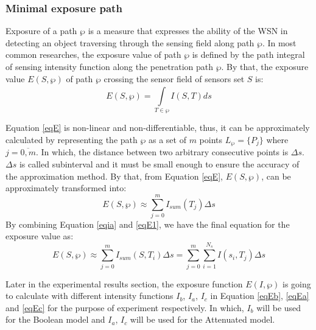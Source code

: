 \documentclass[final]{elsarticle}
\begin{document}
\subsubsection{Minimal exposure path}
Exposure of a path $ \wp $ is a measure that expresses the ability of the WSN in detecting an object traversing through the sensing field along path $ \wp $. In most common researches, the exposure value of path $ \wp $ is defined by the path integral of sensing intensity function along the penetration path $ \wp $. By that, the exposure value $  E(S,\wp ) $ of path $ \wp $ crossing the sensor field of sensors set $ S $ is:
\begin{equation}
\label{eqE}
E(S,\wp ) = \int\limits_{T \in \wp }^{} {I(S, T)} ds
\end{equation}

Equation \eqref{eqE} is non-linear and non-differentiable, thus,
it can be approximately calculated by representing the path $\wp $ as a set
of $ m $ points ${L_\wp } = \{ {P_j}\} $ where $j = \overline {0,m} $. In which, the distance between two arbitrary consecutive points is $\Delta s$. $\Delta s$ is called subinterval and it must be small enough to ensure the accuracy of the approximation method. By that, from Equation \eqref{eqE}, $ E(S,\wp ) $, can be approximately transformed into:
\begin{equation}
\label{eqE1}
E(S,\wp) \approx \sum\limits_{j = 0}^m {I_{sum}(T_j)\Delta s} 
\end{equation}
By combining Equation \eqref{eqia} and \eqref{eqE1}, we have the final equation for the exposure value as:
\begin{equation}
\label{eqEa}
E(S,\wp) \approx \sum\limits_{j = 0}^m {I_{sum}(S,T_i)\Delta s}  = \sum\limits_{j=0}^m {\sum\limits_{i=1}^{N_s} {I({s_i},{T_j})}} \Delta s
\end{equation}

Later in the experimental results section, the exposure function $ E(I,\wp )$ is going to calculate with different intensity functions $ I_b $,  $ I_a $, $ I_c$ in Equation \eqref{eqEb}, \eqref{eqEa} and \eqref{eqEc} for the purpose of experiment respectively. In which, $ I_b $ will be used for the Boolean model and $ I_a $, $ I_c$ will be used for the Attenuated model.
\end{document}
